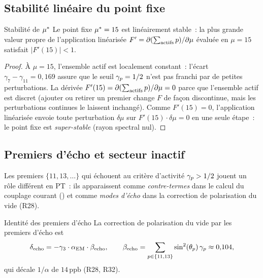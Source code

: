 \documentclass[12pt,a4paper]{article}
\begin{document}
\subsection{Stabilité linéaire du point fixe}
\label{sec:ch8_stability}

\begin{thmbox}{Stabilité de ${\mu^{*}}$}
\label{thm:stability}
Le point fixe ${\mu^{*}} = 15$ est linéairement stable~: la plus grande
valeur propre de l'application linéarisée
$F' = \partial(\sum_{\rm actifs} p)/\partial\mu$
évaluée en $\mu = 15$ satisfait $|F'(15)| < 1$.

\begin{proof}
À $\mu = 15$, l'ensemble actif est localement constant~: l'écart
$\gamma_7 - \gamma_{11} = 0{,}169$ assure que le seuil
$\gamma_{p} = 1/2$ n'est pas franchi par de petites perturbations.
La dérivée $F'(15) = \partial(\sum_{\rm actifs} p)/\partial\mu = 0$
parce que l'ensemble actif est discret (ajouter ou retirer un premier
change $F$ de façon discontinue, mais les perturbations continues
le laissent inchangé). Comme $F'(15) = 0$, l'application linéarisée
envoie toute perturbation $\delta\mu$ sur $F'(15)\cdot\delta\mu = 0$
en une seule étape~: le point fixe est \emph{super-stable} (rayon
spectral nul).
\end{proof}
\end{thmbox}

\subsection{Premiers d'écho et secteur inactif}
\label{sec:ch8_ghost}

Les premiers $\{11, 13, \ldots\}$ qui échouent au critère d'activité
$\gamma_{p} > 1/2$ jouent un rôle différent en PT~: ils apparaissent
comme \emph{contre-termes} dans le calcul du couplage courant
(\cite{companion_physics}) et comme \emph{modes d'écho} dans la
correction de polarisation du vide (R28).

\begin{idbox}{Identité des premiers d'écho}
\label{id:ghost}
La correction de polarisation du vide par les premiers d'écho est
\begin{equation}
  \delta_{\rm echo} = -\gamma_3 \cdot \alpha_{\mathrm{EM}} \cdot \beta_{\rm echo},
  \qquad
  \beta_{\rm echo} = \sum_{p \in \{11,13\}} \sin^2(\theta_{p})\,\gamma_{p}
  \approx 0{,}104,
  \label{eq:ghost_correction}
\end{equation}
qui décale $1/\alpha$ de $14\,\text{ppb}$ (R28, R32).
\end{idbox}
\end{document}
